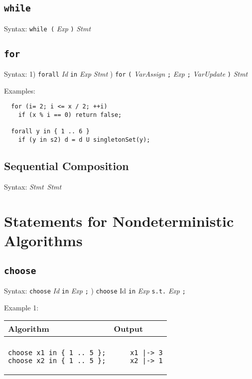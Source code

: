 \documentclass[a4paper]{report}
\begin{document}
\subsection{\texttt{while}}

Syntax: \verb'while (' {\it Exp} \verb')' {\it Stmt} 


\subsection{\texttt{for}}

Syntax: 1) \verb"forall" {\it Id} \verb"in" {\it Exp}  {\it Stmt} ) \verb"for" \verb"(" {\it VarAssign} \verb";" {\it Exp} \verb";" {\it VarUpdate} \verb")" {\it Stmt}

Examples:
\begin{verbatim}
  for (i= 2; i <= x / 2; ++i) 
    if (x % i == 0) return false;

  forall y in { 1 .. 6 }
    if (y in s2) d = d U singletonSet(y);
\end{verbatim}



\subsection{Sequential Composition}

Syntax: {\it Stmt}~{\it Stmt}

\section{Statements for Nondeterministic Algorithms}

\subsection{\texttt{choose}}

Syntax:  \verb"choose" {\it Id} \verb"in" {\it Exp} \verb";"  ) \verb"choose" Id \verb"in" {\it Exp} \verb"s.t." {\it Exp} \verb";"    

Example 1:
\begin{center}
\begin{tabular}{ll}
Algorithm & Output\\
\hline
\\
\begin{minipage}{.45\textwidth}
\begin{verbatim}
choose x1 in { 1 .. 5 };
choose x2 in { 1 .. 5 };
\end{verbatim}
\end{minipage}
&
\begin{minipage}{.45\textwidth}
\begin{verbatim}
    x1 |-> 3
    x2 |-> 1
\end{verbatim}
\end{minipage}
\end{tabular}
\end{center}
\end{document}

